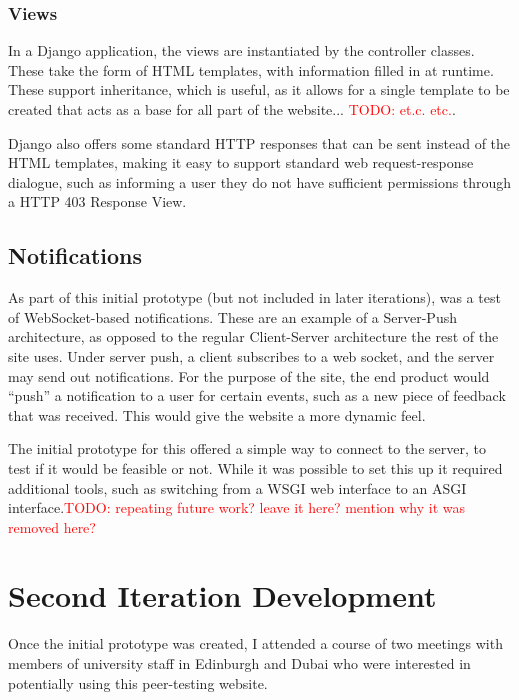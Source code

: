 \documentclass[a4paper,11pt]{report}
\newcommand{\todo}[1]{\textcolor{red}{TODO: #1}}
\begin{document}
\subsection{Views}
In a Django application, the views are instantiated by the controller classes. These take the form of HTML templates, with information filled in at runtime. These support inheritance, which is useful, as it allows for a single template to be created that acts as a base for all part of the website... \todo{et.c. etc.}.\par
Django also offers some standard HTTP responses that can be sent instead of the HTML templates, making it easy to support standard web request-response dialogue, such as informing a user they do not have sufficient permissions through a HTTP 403 Response View.

\section{Notifications}
As part of this initial prototype (but not included in later iterations), was a test of WebSocket-based notifications. These are an example of a Server-Push architecture, as opposed to the regular Client-Server architecture the rest of the site uses. Under server push, a client subscribes to a web socket, and the server may send out notifications. For the purpose of the site, the end product would ``push'' a notification to a user for certain events, such as a new piece of feedback that was received. This would give the website a more dynamic feel.\par
The initial prototype for this offered a simple way to connect to the server, to test if it would be feasible or not. While it was possible to set this up it required additional tools, such as switching from a WSGI web interface to an ASGI interface.\todo{repeating future work? leave it here? mention why it was removed here?}

\chapter{Second Iteration Development}
Once the initial prototype was created, I attended a course of two meetings with members of university staff in Edinburgh and Dubai who were interested in potentially using this peer-testing website.\par
\end{document}
